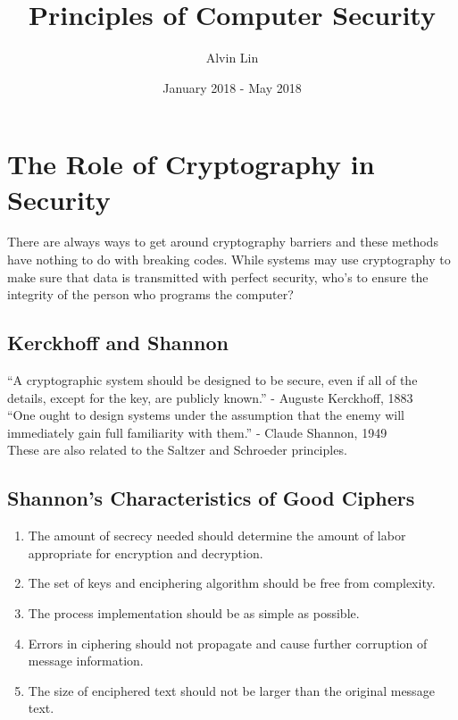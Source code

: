 \documentclass{math}
\title{Principles of Computer Security}
\author{Alvin Lin}
\date{January 2018 - May 2018}
\begin{document}
\maketitle

\section*{The Role of Cryptography in Security}
There are always ways to get around cryptography barriers and these methods have
nothing to do with breaking codes. While systems may use cryptography to make
sure that data is transmitted with perfect security, who's to ensure the
integrity of the person who programs the computer?

\subsection*{Kerckhoff and Shannon}
``A cryptographic system should be designed to be secure, even if all of the
details, except for the key, are publicly known.'' - Auguste Kerckhoff, 1883 \\
``One ought to design systems under the assumption that the enemy will
immediately gain full familiarity with them.'' - Claude Shannon, 1949 \\
These are also related to the Saltzer and Schroeder principles.

\subsection*{Shannon's Characteristics of Good Ciphers}
\begin{enumerate}
  \item The amount of secrecy needed should determine the amount of labor
  appropriate for encryption and decryption.
  \item The set of keys and enciphering algorithm should be free from
  complexity.
  \item The process implementation should be as simple as possible.
  \item Errors in ciphering should not propagate and cause further corruption
  of message information.
  \item The size of enciphered text should not be larger than the original
  message text.
\end{enumerate}
\end{document}
